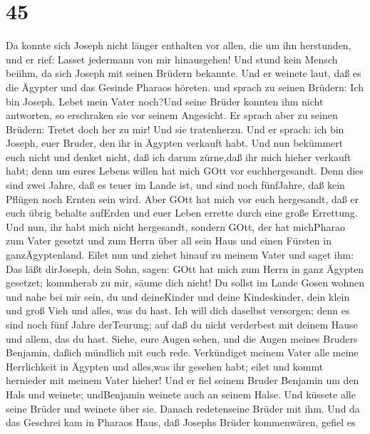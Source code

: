\hypertarget{section-44}{%
\section{45}\label{section-44}}

 Da konnte sich Joseph nicht länger enthalten vor allen, die
um ihn herstunden, und er rief: Lasset jedermann von mir hinausgehen!
Und stund kein Mensch beiihm, da sich Joseph mit seinen Brüdern
bekannte.  Und er weinete laut, daß es die Ägypter und das
Gesinde Pharaos höreten.  und sprach zu seinen Brüdern: Ich
bin Joseph. Lebet mein Vater noch?Und seine Brüder konnten ihm nicht
antworten, so erschraken sie vor seinem Angesicht.  Er
sprach aber zu seinen Brüdern: Tretet doch her zu mir! Und sie
tratenherzu. Und er sprach: ich bin Joseph, euer Bruder, den ihr in
Ägypten verkauft habt.  Und nun bekümmert euch nicht und
denket nicht, daß ich darum zürne,daß ihr mich hieher verkauft habt;
denn um eures Lebens willen hat mich GOtt vor euchhergesandt.
 Denn dies sind zwei Jahre, daß es teuer im Lande ist, und
sind noch fünfJahre, daß kein Pflügen noch Ernten sein wird.
 Aber GOtt hat mich vor euch hergesandt, daß er euch übrig
behalte aufErden und euer Leben errette durch eine große Errettung.
 Und nun, ihr habt mich nicht hergesandt, sondern GOtt, der
hat michPharao zum Vater gesetzt und zum Herrn über all sein Haus und
einen Fürsten in ganzÄgyptenland.  Eilet nun und ziehet
hinauf zu meinem Vater und saget ihm: Das läßt dirJoseph, dein Sohn,
sagen: GOtt hat mich zum Herrn in ganz Ägypten gesetzet; kommherab zu
mir, säume dich nicht!  Du sollst im Lande Gosen wohnen und
nahe bei mir sein, du und deineKinder und deine Kindeskinder, dein klein
und groß Vieh und alles, was du hast.  Ich will dich
daselbst versorgen; denn es sind noch fünf Jahre derTeurung; auf daß du
nicht verderbest mit deinem Hause und allem, das du hast. 
Siehe, eure Augen sehen, und die Augen meines Bruders Benjamin, daßich
mündlich mit euch rede.  Verkündiget meinem Vater alle
meine Herrlichkeit in Ägypten und alles,was ihr gesehen habt; eilet und
kommt hernieder mit meinem Vater hieher!  Und er fiel
seinem Bruder Benjamin um den Hals und weinete; undBenjamin weinete auch
an seinem Halse.  Und küssete alle seine Brüder und weinete
über sie. Danach redetenseine Brüder mit ihm.  Und da das
Geschrei kam in Pharaos Haus, daß Josephs Brüder kommenwären, gefiel es
